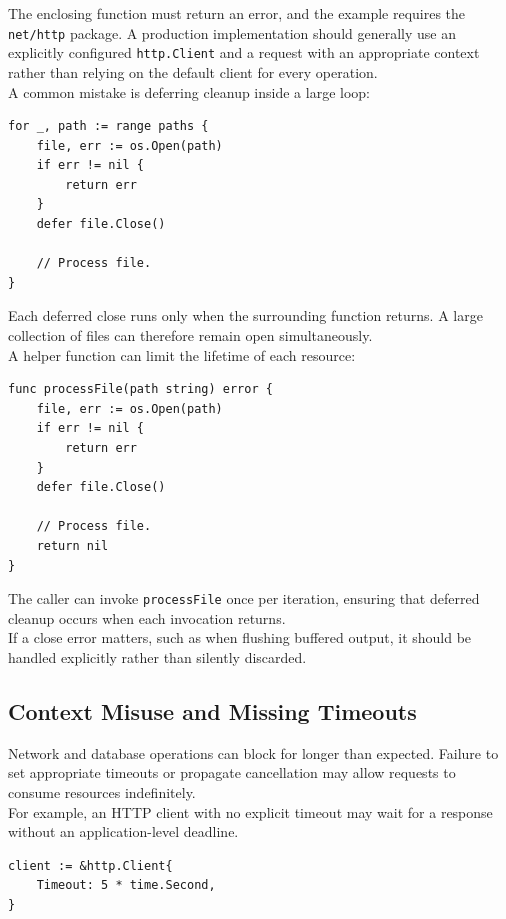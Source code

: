 The enclosing function must return an error, and the example requires the \texttt{net/http} package. A production implementation should generally use an explicitly configured \texttt{http.Client} and a request with an appropriate context rather than relying on the default client for every operation.\\

A common mistake is deferring cleanup inside a large loop:

\begin{lstlisting}
for _, path := range paths {
    file, err := os.Open(path)
    if err != nil {
        return err
    }
    defer file.Close()

    // Process file.
}
\end{lstlisting}

Each deferred close runs only when the surrounding function returns. A large collection of files can therefore remain open simultaneously.\\

A helper function can limit the lifetime of each resource:

\begin{lstlisting}
func processFile(path string) error {
    file, err := os.Open(path)
    if err != nil {
        return err
    }
    defer file.Close()

    // Process file.
    return nil
}
\end{lstlisting}

The caller can invoke \texttt{processFile} once per iteration, ensuring that deferred cleanup occurs when each invocation returns.\\

If a close error matters, such as when flushing buffered output, it should be handled explicitly rather than silently discarded.

\subsection{Context Misuse and Missing Timeouts}

Network and database operations can block for longer than expected. Failure to set appropriate timeouts or propagate cancellation may allow requests to consume resources indefinitely.\\

For example, an HTTP client with no explicit timeout may wait for a response without an application-level deadline.

\begin{lstlisting}
client := &http.Client{
    Timeout: 5 * time.Second,
}
\end{lstlisting}

